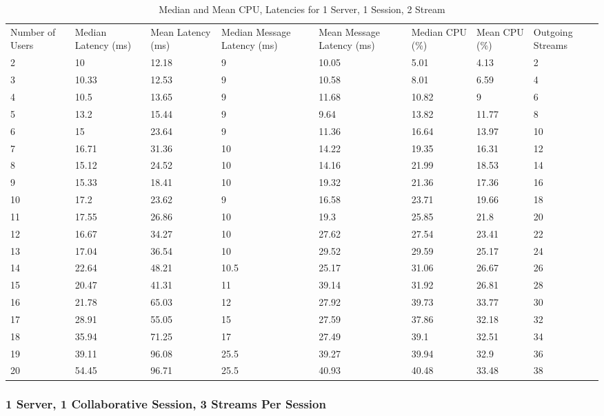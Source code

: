 \begin{table}
\caption{Median and Mean CPU, Latencies for 1 Server, 1 Session, 2 Stream}
\label{table:1serv_1sess_2str}
\begin{tabu} to\linewidth{|X[c]|X[c]|X[c]|X[c]|X[c]|X[c]|X[c]|X[c]|}
\everyrow{\hline}
\hline
Number of Users & Median Latency (ms) & Mean Latency (ms) & Median Message Latency (ms) & Mean Message Latency (ms) & Median CPU (\%) & Mean CPU (\%) & Outgoing Streams\\
2 & 10 & 12.18 & 9 & 10.05 & 5.01 & 4.13 & 2 \\
3 & 10.33 & 12.53 & 9 & 10.58 & 8.01 & 6.59 & 4 \\
4 & 10.5 & 13.65 & 9 & 11.68 & 10.82 & 9 & 6 \\
5 & 13.2 & 15.44 & 9 & 9.64 & 13.82 & 11.77 & 8 \\
6 & 15 & 23.64 & 9 & 11.36 & 16.64 & 13.97 & 10 \\
7 & 16.71 & 31.36 & 10 & 14.22 & 19.35 & 16.31 & 12 \\
8 & 15.12 & 24.52 & 10 & 14.16 & 21.99 & 18.53 & 14 \\
9 & 15.33 & 18.41 & 10 & 19.32 & 21.36 & 17.36 & 16 \\
10 & 17.2 & 23.62 & 9 & 16.58 & 23.71 & 19.66 & 18 \\
11 & 17.55 & 26.86 & 10 & 19.3 & 25.85 & 21.8 & 20 \\
12 & 16.67 & 34.27 & 10 & 27.62 & 27.54 & 23.41 & 22 \\
13 & 17.04 & 36.54 & 10 & 29.52 & 29.59 & 25.17 & 24 \\
14 & 22.64 & 48.21 & 10.5 & 25.17 & 31.06 & 26.67 & 26 \\
15 & 20.47 & 41.31 & 11 & 39.14 & 31.92 & 26.81 & 28 \\
16 & 21.78 & 65.03 & 12 & 27.92 & 39.73 & 33.77 & 30 \\
17 & 28.91 & 55.05 & 15 & 27.59 & 37.86 & 32.18 & 32 \\
18 & 35.94 & 71.25 & 17 & 27.49 & 39.1 & 32.51 & 34 \\
19 & 39.11 & 96.08 & 25.5 & 39.27 & 39.94 & 32.9 & 36 \\
20 & 54.45 & 96.71 & 25.5 & 40.93 & 40.48 & 33.48 & 38 \\
\end{tabu}
\end{table}

\clearpage\subsubsection{1 Server, 1 Collaborative Session, 3 Streams Per Session}
\label{sec:1serv_1sess_3str180}

